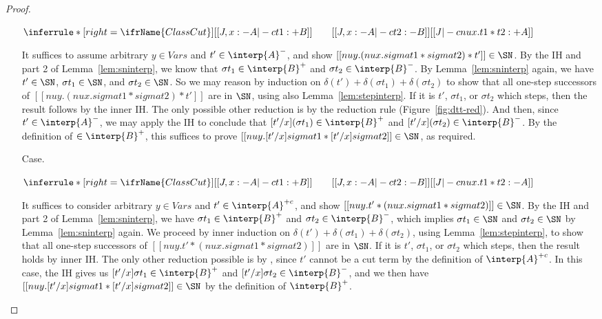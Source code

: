 \begin{proof}
\begin{itemize}
\vspace{-.2cm}
\begin{center}
\begin{math}
\inferrule* [right=\ifrName{ClassCut}] {[[ J , x : - A  |-c t1 : + B ]]  \qquad [[  J , x : - A  |-c t2 : - B ]]}{[[  J |-c nu x . t1 * t2 : + A ]]}
\end{math}
\end{center}
It suffices to assume arbitrary $y\in\textit{Vars}$ and
$t'\in\interp{A}^-$, and show $[[nu y . (nu x . sigma t1 * sigma t2) *
t']]\in\SN$.  By the IH and part 2 of Lemma~\ref{lem:sninterp}, we
know that $\sigma t_1\in\interp{B}^+$ and $\sigma t_2\in\interp{B}^-$.
By Lemma~\ref{lem:sninterp} again, we have $t'\in\SN$, $\sigma
t_1\in\SN$, and $\sigma t_2\in\SN$.  So we may reason by induction on
$\delta(t')+\delta(\sigma t_1)+\delta(\sigma t_2)$ to show that all
one-step successors of $[[nu y . (nu x . sigma t1 * sigma t2) * t']]$
are in $\SN$, using also Lemma~\ref{lem:stepinterp}.  If it is $t'$,
$\sigma t_1$, or $\sigma t_2$ which steps, then the result follows by
the inner IH.  The only possible other reduction is by the
 reduction rule (Figure~\ref{fig:dtt-red}).  And
then, since $t'\in\interp{A}^-$, we may apply the IH to conclude that
$[t'/x](\sigma t_1)\in\interp{B}^+$ and $[t'/x](\sigma t_2)\in\interp{B}^-$.
By the definition of $\in\interp{B}^+$, this suffices to prove
$[[nu y . [t'/x] sigma t1 * [t'/x]sigma t2]]\in\SN$, as required.

\item[Case.]\ 

\vspace{-.2cm}
\begin{center}
\begin{math}
\inferrule* [right=\ifrName{ClassCut}] {[[ J , x : - A  |-c t1 : + B ]]  \qquad [[  J , x : - A  |-c t2 : - B ]]}{[[  J |-c nu x . t1 * t2 : - A ]]}
\end{math}
\end{center}
It suffices to consider arbitrary $y\in\textit{Vars}$ and
$t'\in\interp{A}^{+c}$, and show $[[nu y. t' * (nu x . sigma t1 *
sigma t2)]]\in\SN$.  By the IH and part 2 of Lemma~\ref{lem:sninterp},
we have $\sigma t_1\in\interp{B}^+$ and $\sigma t_2\in\interp{B}^-$,
which implies $\sigma t_1\in\SN$ and $\sigma t_2\in\SN$ by
Lemma~\ref{lem:sninterp} again.  We proceed by inner induction on
$\delta(t')+\delta(\sigma t_1)+\delta(\sigma t_2)$, using
Lemma~\ref{lem:stepinterp}, to show that all one-step successors of
$[[nu y. t' * (nu x . sigma t1 * sigma t2)]]$ are in $\SN$.  If it is
$t'$, $\sigma t_1$, or $\sigma t_2$ which steps, then the result holds
by inner IH.  The only other reduction possible is by
, since $t'$ cannot be a cut term by the
definition of $\interp{A}^{+c}$.  In this case, the IH gives us
$[t'/x]\sigma t_1\in\interp{B}^+$ and $[t'/x]\sigma
t_2\in\interp{B}^-$, and we then have $[[nu y . [t'/x]sigma t1 *
[t'/x]sigma t2]]\in\SN$ by the definition of $\interp{B}^+$.
\end{itemize}
\end{proof}

